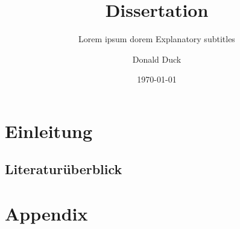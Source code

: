 \documentclass[german]{dlrib}
\title[dasdas]{Dissertation}
\subtitle{Lorem ipsum dorem Explanatory subtitles}
\author{Donald Duck}
\date{\today}
\begin{document}
\maketitle

\frontmatter

\tableofcontents

\listoffigures

\listoftables

\mainmatter

\chapter{Einleitung}

\section{Literaturüberblick}


\chapter{Appendix}
\end{document}
